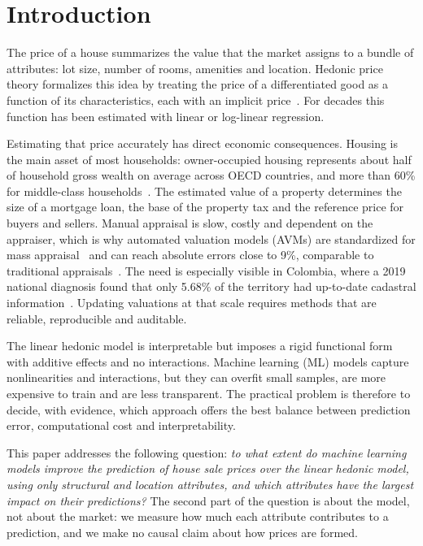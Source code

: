 \documentclass[conference]{IEEEtran}
\begin{document}
\section{Introduction}

The price of a house summarizes the value that the market assigns to a bundle of attributes: lot size, number of rooms, amenities and location. Hedonic price theory formalizes this idea by treating the price of a differentiated good as a function of its characteristics, each with an implicit price~\cite{rosen1974}. For decades this function has been estimated with linear or log-linear regression.

Estimating that price accurately has direct economic consequences. Housing is the main asset of most households: owner-occupied housing represents about half of household gross wealth on average across OECD countries, and more than 60\% for middle-class households~\cite{oecd2022}. The estimated value of a property determines the size of a mortgage loan, the base of the property tax and the reference price for buyers and sellers. Manual appraisal is slow, costly and dependent on the appraiser, which is why automated valuation models (AVMs) are standardized for mass appraisal~\cite{iaao2018} and can reach absolute errors close to 9\%, comparable to traditional appraisals~\cite{kok2017}. The need is especially visible in Colombia, where a 2019 national diagnosis found that only 5.68\% of the territory had up-to-date cadastral information~\cite{conpes3958}. Updating valuations at that scale requires methods that are reliable, reproducible and auditable.

The linear hedonic model is interpretable but imposes a rigid functional form with additive effects and no interactions. Machine learning (ML) models capture nonlinearities and interactions, but they can overfit small samples, are more expensive to train and are less transparent. The practical problem is therefore to decide, with evidence, which approach offers the best balance between prediction error, computational cost and interpretability.

This paper addresses the following question: \emph{to what extent do machine learning models improve the prediction of house sale prices over the linear hedonic model, using only structural and location attributes, and which attributes have the largest impact on their predictions?} The second part of the question is about the model, not about the market: we measure how much each attribute contributes to a prediction, and we make no causal claim about how prices are formed.
\end{document}
